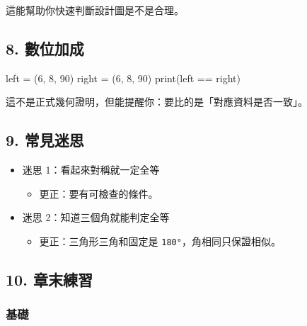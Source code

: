 \documentclass[
  chinese,
  12pt,
  a4paper,
  oneside]{article}
\newenvironment{Shaded}{}{}
\newcommand{\BuiltInTok}[1]{\textcolor[rgb]{0.00,0.50,0.00}{#1}}
\newcommand{\DecValTok}[1]{\textcolor[rgb]{0.25,0.63,0.44}{#1}}
\newcommand{\NormalTok}[1]{#1}
\newcommand{\OperatorTok}[1]{\textcolor[rgb]{0.40,0.40,0.40}{#1}}
\providecommand{\tightlist}{%
  \setlength{\itemsep}{0pt}\setlength{\parskip}{0pt}}
\begin{document}
這能幫助你快速判斷設計圖是不是合理。

\subsection{8. 數位加成}\label{ux6578ux4f4dux52a0ux6210-3}

\begin{Shaded}
\begin{Highlighting}[]
\NormalTok{left }\OperatorTok{=}\NormalTok{ (}\DecValTok{6}\NormalTok{, }\DecValTok{8}\NormalTok{, }\DecValTok{90}\NormalTok{)}
\NormalTok{right }\OperatorTok{=}\NormalTok{ (}\DecValTok{6}\NormalTok{, }\DecValTok{8}\NormalTok{, }\DecValTok{90}\NormalTok{)}
\BuiltInTok{print}\NormalTok{(left }\OperatorTok{==}\NormalTok{ right)}
\end{Highlighting}
\end{Shaded}

這不是正式幾何證明，但能提醒你：要比的是「對應資料是否一致」。

\subsection{9. 常見迷思}\label{ux5e38ux898bux8ff7ux601d-3}

\begin{itemize}
\tightlist
\item
  迷思 1：看起來對稱就一定全等

  \begin{itemize}
  \tightlist
  \item
    更正：要有可檢查的條件。
  \end{itemize}
\item
  迷思 2：知道三個角就能判定全等

  \begin{itemize}
  \tightlist
  \item
    更正：三角形三角和固定是 \texttt{180°}，角相同只保證相似。
  \end{itemize}
\end{itemize}

\subsection{10. 章末練習}\label{ux7ae0ux672bux7df4ux7fd2-3}

\subsubsection{基礎}\label{ux57faux790e-3}
\end{document}
